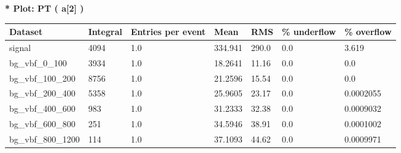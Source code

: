 \documentclass[a4paper, 10pt]{article}
\begin{document}
\textbf{* Plot: PT ( a[2] ) }\\
   \begin{table}[H]
  \begin{center}
    \begin{tabular}{|m{23.0mm}|m{23.0mm}|m{18.0mm}|m{19.0mm}|m{19.0mm}|m{19.0mm}|m{19.0mm}|}
      \hline
      {\cellcolor{yellow}         Dataset}& {\cellcolor{yellow}         Integral}& {\cellcolor{yellow}         Entries per event}& {\cellcolor{yellow}         Mean}& {\cellcolor{yellow}         RMS}& {\cellcolor{yellow}         \% underflow}& {\cellcolor{yellow}         \% overflow}\\
      \hline
      {\cellcolor{white}         signal}& {\cellcolor{white}         4094}& {\cellcolor{white}         1.0}& {\cellcolor{white}         334.941}& {\cellcolor{white}         290.0}& {\cellcolor{green}         0.0}& {\cellcolor{green}         3.619}\\
      \hline
      {\cellcolor{white}         bg\_vbf\_0\_100}& {\cellcolor{white}         3934}& {\cellcolor{white}         1.0}& {\cellcolor{white}         18.2641}& {\cellcolor{white}         11.16}& {\cellcolor{green}         0.0}& {\cellcolor{green}         0.0}\\
      \hline
      {\cellcolor{white}         bg\_vbf\_100\_200}& {\cellcolor{white}         8756}& {\cellcolor{white}         1.0}& {\cellcolor{white}         21.2596}& {\cellcolor{white}         15.54}& {\cellcolor{green}         0.0}& {\cellcolor{green}         0.0}\\
      \hline
      {\cellcolor{white}         bg\_vbf\_200\_400}& {\cellcolor{white}         5358}& {\cellcolor{white}         1.0}& {\cellcolor{white}         25.9605}& {\cellcolor{white}         23.17}& {\cellcolor{green}         0.0}& {\cellcolor{green}         0.0002055}\\
      \hline
      {\cellcolor{white}         bg\_vbf\_400\_600}& {\cellcolor{white}         983}& {\cellcolor{white}         1.0}& {\cellcolor{white}         31.2333}& {\cellcolor{white}         32.38}& {\cellcolor{green}         0.0}& {\cellcolor{green}         0.0009032}\\
      \hline
      {\cellcolor{white}         bg\_vbf\_600\_800}& {\cellcolor{white}         251}& {\cellcolor{white}         1.0}& {\cellcolor{white}         34.5946}& {\cellcolor{white}         38.91}& {\cellcolor{green}         0.0}& {\cellcolor{green}         0.0001002}\\
      \hline
      {\cellcolor{white}         bg\_vbf\_800\_1200}& {\cellcolor{white}         114}& {\cellcolor{white}         1.0}& {\cellcolor{white}         37.1093}& {\cellcolor{white}         44.62}& {\cellcolor{green}         0.0}& {\cellcolor{green}         0.0009971}\\

\end{tabular}
\end{center}
\end{table}
\end{document}
